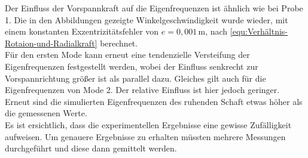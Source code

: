 	 Der Einfluss der Vorspannkraft auf die Eigenfrequenzen ist ähnlich wie bei Probe 1. Die in den Abbildungen gezeigte Winkelgeschwindigkeit wurde wieder, mit einem konstanten Exzentrizitätsfehler von $ e=0,001\,\text{m}$, nach \ref{equ:Verhältnis-Rotaion-und-Radialkraft} berechnet. \\
	 Für den ersten Mode kann erneut eine tendenzielle Versteifung der Eigenfrequenzen festgestellt werden, wobei der Einfluss senkrecht zur Vorspannrichtung größer ist als parallel dazu. Gleiches gilt auch für die Eigenfrequenzen von Mode 2. Der relative Einfluss ist hier jedoch geringer.
	 Erneut sind die simulierten Eigenfrequenzen des ruhenden Schaft etwas höher als die gemessenen Werte. 
	 \\
	 Es ist ersichtlich, dass die experimentellen Ergebnisse eine gewisse Zufälligkeit aufweisen. Um genauere Ergebnisse zu erhalten müssten mehrere Messungen durchgeführt und diese dann gemittelt werden.
	
	